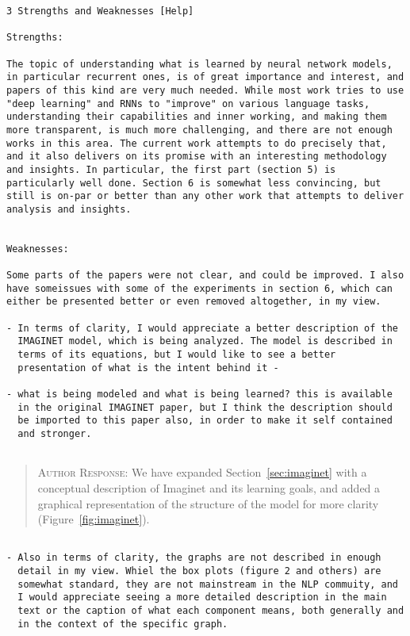 \begin{verbatim}
3 Strengths and Weaknesses [Help]

Strengths:

The topic of understanding what is learned by neural network models,
in particular recurrent ones, is of great importance and interest, and
papers of this kind are very much needed. While most work tries to use
"deep learning" and RNNs to "improve" on various language tasks,
understanding their capabilities and inner working, and making them
more transparent, is much more challenging, and there are not enough
works in this area. The current work attempts to do precisely that,
and it also delivers on its promise with an interesting methodology
and insights. In particular, the first part (section 5) is
particularly well done. Section 6 is somewhat less convincing, but
still is on-par or better than any other work that attempts to deliver
analysis and insights.


Weaknesses:
 
Some parts of the papers were not clear, and could be improved. I also
have someissues with some of the experiments in section 6, which can
either be presented better or even removed altogether, in my view.

- In terms of clarity, I would appreciate a better description of the
  IMAGINET model, which is being analyzed. The model is described in
  terms of its equations, but I would like to see a better
  presentation of what is the intent behind it -

- what is being modeled and what is being learned? this is available
  in the original IMAGINET paper, but I think the description should
  be imported to this paper also, in order to make it self contained
  and stronger.
  
\end{verbatim}  
\begin{quote}
\textsc{Author Response:}
We have expanded Section~\ref{sec:imaginet} with a conceptual
description of {\sc Imaginet} and its learning goals, and added a graphical
representation of the structure of the model for more clarity (Figure~\ref{fig:imaginet}).
\end{quote}
\begin{verbatim}

- Also in terms of clarity, the graphs are not described in enough
  detail in my view. Whiel the box plots (figure 2 and others) are
  somewhat standard, they are not mainstream in the NLP commuity, and
  I would appreciate seeing a more detailed description in the main
  text or the caption of what each component means, both generally and
  in the context of the specific graph.
\end{verbatim}  
